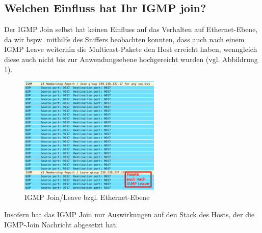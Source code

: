 \documentclass[a4paper,10pt]{article}
\begin{document}
\subsection{Welchen Einfluss hat Ihr IGMP join?}

Der IGMP Join selbst hat keinen Einfluss auf das Verhalten auf Ethernet-Ebene,
da wir bspw. mithilfe des Sniffers beobachten konnten, 
dass auch nach einem IGMP Leave weiterhin die Multicast-Pakete den Host erreicht haben,
wenngleich diese auch nicht bis zur Anwendungsebene hochgereicht wurden (vgl. Abbildrung \ref{multicast_after_leave}).

\begin{figure}[h]
	\begin{center}
		\includegraphics[width=0.6\textwidth]{multicast_after_leave.png}
	\end{center}

	\caption{IGMP Join/Leave bzgl. Ethernet-Ebene}

	\label{multicast_after_leave}
\end{figure}

Insofern hat das IGMP Join nur Auswirkungen auf den Stack des Hosts, 
der die IGMP-Join Nachricht abgesetzt hat.
\end{document}
